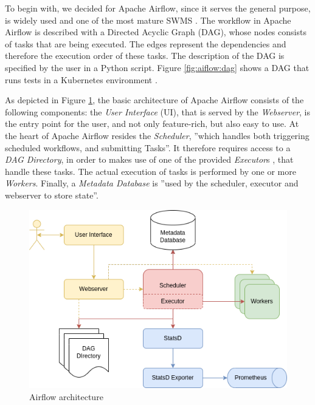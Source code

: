 \documentclass[a4paper,journal]{IEEEtran}
\begin{document}
To begin with, we decided for Apache Airflow, since it serves the general purpose, is widely used and one of the most mature SWMS \cite{harenslak2021data}. The workflow in Apache Airflow is described with a Directed Acyclic Graph (DAG), whose nodes consists of tasks that are being executed. The edges represent the dependencies and therefore the execution order of these tasks. The description of the DAG is specified by the user in a Python script. Figure \ref{fig:aiflow:dag} shows a DAG that runs tests in a Kubernetes environment \cite{airflowDag}.


As depicted in Figure \ref{fig:aiflow:arch}, the basic architecture of Apache Airflow consists of the following components: the \textit{User Interface} (UI), that is served by the \textit{Webserver}, is the entry point for the user, and not only feature-rich, but also easy to use. At the heart of Apache Airflow resides the \textit{Scheduler}, ''which handles both triggering scheduled workflows, and submitting Tasks''\cite{airflowArchitecture}. It therefore requires access to a \textit{DAG Directory}, in order to makes use of one of the provided \textit{Executor}s \cite{airflowExecutor}, that handle these tasks. The actual execution of tasks is performed by one or more \textit{Workers}. Finally, a \textit{Metadata Database} is ''used by the scheduler, executor and webserver to store state''\cite{airflowArchitecture}.
\begin{figure}[h]
    \includegraphics[width=\linewidth]{images/airflow-architecture.png}
    \caption{Airflow architecture}
    \label{fig:aiflow:arch}
\end{figure}
\end{document}
